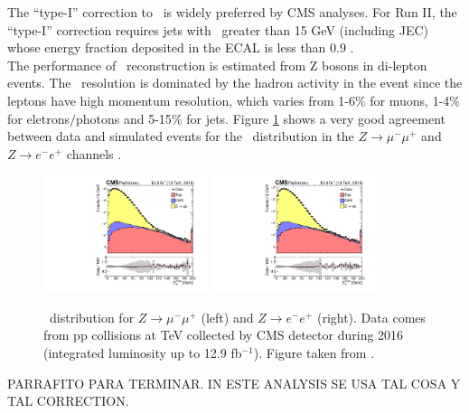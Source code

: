 \noindent The ``type-I'' correction to \METv~is widely preferred by CMS analyses. For Run II, 
the ``type-I'' correction requires jets with \pt~greater than 15 GeV (including JEC) whose  
energy fraction deposited in the ECAL is less than 0.9 \cite{METPerformance2}. \\

\noindent The performance of \MET  ~reconstruction is estimated from Z bosons
in di-lepton events. The \MET~resolution is dominated by the hadron activity 
in the event since the leptons have high momentum resolution, which varies 
from 1-6$\%$ for muons, 1-4$\%$ for eletrons$/$photons and 5-15$\%$ for 
jets. Figure \ref{fig:MetPerfomance} shows a very good agreement between data and 
simulated events for the \MET~distribution in the $Z\rightarrow \mu^{-}\mu^{+}$ 
and $Z\rightarrow e^{-}e^{+}$ channels \cite{METPerformance2}.
 
\begin{figure}[ht]
  \begin{center}
    \includegraphics[width=0.43\textwidth]{figuras/Chapter3/METPerformancemumu.pdf}
    \includegraphics[width=0.43\textwidth]{figuras/Chapter3/METPerformanceee.pdf}
    \caption{\MET~distribution for $Z\rightarrow \mu^{-}\mu^{+}$ (left) and $Z\rightarrow e^{-}e^{+}$ (right). Data comes 
    from pp collisions at  TeV collected by CMS detector during 2016 (integrated luminosity up to 12.9 fb$^{-1}$).
    Figure taken from \cite{METPerformance2}.}
    \label{fig:MetPerfomance}
  \end{center}
\end{figure} 

PARRAFITO PARA TERMINAR. IN ESTE ANALYSIS SE USA TAL COSA Y TAL CORRECTION.

